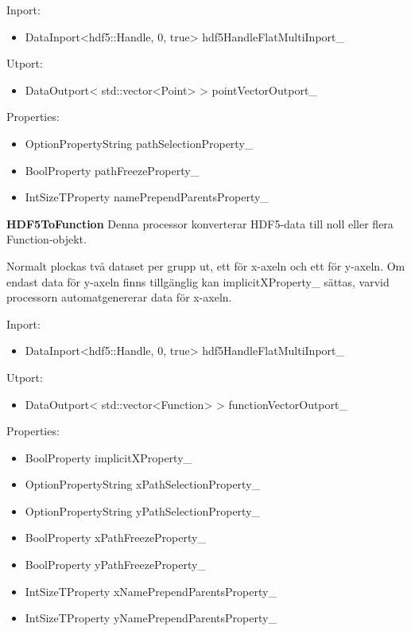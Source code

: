 \documentclass[10pt,oneside,swedish]{article}
\providecommand{\tightlist}{%
  \setlength{\itemsep}{0pt}\setlength{\parskip}{0pt}}
\begin{document}
Inport:

\begin{itemize}
\tightlist
\item
  DataInport\textless{}hdf5::Handle, 0, true\textgreater{}
  hdf5HandleFlatMultiInport\_
\end{itemize}

Utport:

\begin{itemize}
\tightlist
\item
  DataOutport\textless{} std::vector\textless{}Point\textgreater{}
  \textgreater{} pointVectorOutport\_
\end{itemize}

Properties:

\begin{itemize}
\tightlist
\item
  OptionPropertyString pathSelectionProperty\_
\item
  BoolProperty pathFreezeProperty\_
\item
  IntSizeTProperty namePrependParentsProperty\_
\end{itemize}

\textbf{HDF5ToFunction} Denna processor konverterar HDF5-data till noll
eller flera Function-objekt.

Normalt plockas två dataset per grupp ut, ett för x-axeln och ett för
y-axeln. Om endast data för y-axeln finns tillgänglig kan
implicitXProperty\_ sättas, varvid processorn automatgenererar data för
x-axeln.

Inport:

\begin{itemize}
\tightlist
\item
  DataInport\textless{}hdf5::Handle, 0, true\textgreater{}
  hdf5HandleFlatMultiInport\_
\end{itemize}

Utport:

\begin{itemize}
\tightlist
\item
  DataOutport\textless{} std::vector\textless{}Function\textgreater{}
  \textgreater{} functionVectorOutport\_
\end{itemize}

Properties:

\begin{itemize}
\tightlist
\item
  BoolProperty implicitXProperty\_
\item
  OptionPropertyString xPathSelectionProperty\_
\item
  OptionPropertyString yPathSelectionProperty\_
\item
  BoolProperty xPathFreezeProperty\_
\item
  BoolProperty yPathFreezeProperty\_
\item
  IntSizeTProperty xNamePrependParentsProperty\_
\item
  IntSizeTProperty yNamePrependParentsProperty\_
\end{itemize}
\end{document}
